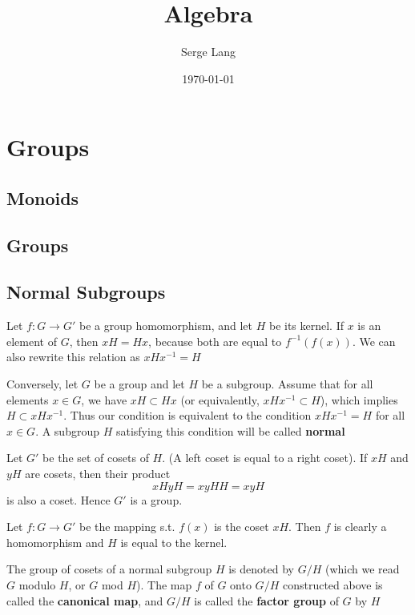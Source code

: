 \documentclass[11pt]{article}
\author{Serge Lang}
\date{\today}
\title{Algebra}
\begin{document}
\maketitle
\tableofcontents

\section{Groups}
\label{sec:org3093d07}
\subsection{Monoids}
\label{sec:orgcb17e35}
\subsection{Groups}
\label{sec:orgb6d46b6}
\subsection{Normal Subgroups}
\label{sec:org95df8d3}
Let \(f:G\to G'\) be a group homomorphism, and let \(H\) be its kernel. If \(x\) is an element
of \(G\), then \(xH=Hx\), because both are equal to \(f^{-1}(f(x))\). We can also rewrite this
relation as \(xHx^{-1}=H\)

Conversely, let \(G\) be a group and let \(H\) be a subgroup. Assume that for all
elements \(x\in G\), we have \(xH\subset Hx\) (or equivalently, \(xHx^{-1}\subset H\)), which
implies \(H\subset xHx^{-1}\). Thus our condition is equivalent to the condition \(xHx^{-1}=H\) for
all \(x\in G\). A subgroup \(H\) satisfying this condition will be called \textbf{normal}

Let \(G'\) be the set of cosets of \(H\). (A left coset is equal to a right coset). If \(xH\)
and \(yH\) are cosets, then their product
\begin{equation*}
xHyH=xyHH=xyH
\end{equation*}
is also a coset. Hence \(G'\) is a group.

Let \(f:G\to G'\) be the mapping s.t. \(f(x)\) is the coset \(xH\). Then \(f\) is clearly a
homomorphism and \(H\) is equal to the kernel.

The group of cosets of a normal subgroup \(H\) is denoted by \(G/H\) (which we read \(G\)
modulo \(H\), or \(G\) mod \(H\)). The map \(f\) of \(G\) onto \(G/H\) constructed above is
called the \textbf{canonical map}, and \(G/H\) is called the \textbf{factor group} of \(G\) by \(H\)
\end{document}
